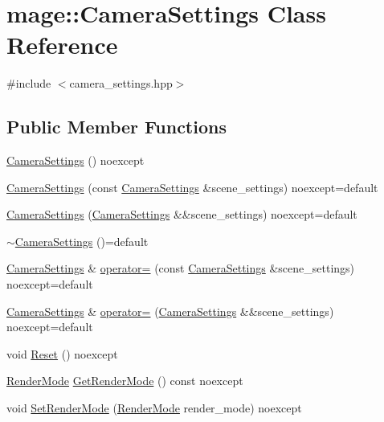 \hypertarget{classmage_1_1_camera_settings}{}\section{mage\+:\+:Camera\+Settings Class Reference}
\label{classmage_1_1_camera_settings}


{\ttfamily \#include $<$camera\+\_\+settings.\+hpp$>$}

\subsection*{Public Member Functions}
\begin{DoxyCompactItemize}
\item 
\hyperlink{classmage_1_1_camera_settings_aaade0b72e225ace41e903fcf8108094c}{Camera\+Settings} () noexcept
\item 
\hyperlink{classmage_1_1_camera_settings_a9122f443d253a17937e940883c201c6f}{Camera\+Settings} (const \hyperlink{classmage_1_1_camera_settings}{Camera\+Settings} \&scene\+\_\+settings) noexcept=default
\item 
\hyperlink{classmage_1_1_camera_settings_aee7693137ac49fe16c184547bbb525bb}{Camera\+Settings} (\hyperlink{classmage_1_1_camera_settings}{Camera\+Settings} \&\&scene\+\_\+settings) noexcept=default
\item 
\hyperlink{classmage_1_1_camera_settings_a738a93dc2e1aed2cac7a58af658984f3}{$\sim$\+Camera\+Settings} ()=default
\item 
\hyperlink{classmage_1_1_camera_settings}{Camera\+Settings} \& \hyperlink{classmage_1_1_camera_settings_aea52aa4b415d5b9a67f03e77a1979f47}{operator=} (const \hyperlink{classmage_1_1_camera_settings}{Camera\+Settings} \&scene\+\_\+settings) noexcept=default
\item 
\hyperlink{classmage_1_1_camera_settings}{Camera\+Settings} \& \hyperlink{classmage_1_1_camera_settings_a834ce70b367d3bc70d2c4407b05ce59b}{operator=} (\hyperlink{classmage_1_1_camera_settings}{Camera\+Settings} \&\&scene\+\_\+settings) noexcept=default
\item 
void \hyperlink{classmage_1_1_camera_settings_a4894cae6954c111339be554e8dd9562c}{Reset} () noexcept
\item 
\hyperlink{namespacemage_a5e7e18b0154373ce8fc942fe3f6b27fd}{Render\+Mode} \hyperlink{classmage_1_1_camera_settings_a6673291bcfed8fa2c0a0041bf8f97f24}{Get\+Render\+Mode} () const noexcept
\item 
void \hyperlink{classmage_1_1_camera_settings_ab0d6720a08e88e018c2a2e6097933d98}{Set\+Render\+Mode} (\hyperlink{namespacemage_a5e7e18b0154373ce8fc942fe3f6b27fd}{Render\+Mode} render\+\_\+mode) noexcept

\end{DoxyCompactItemize}
